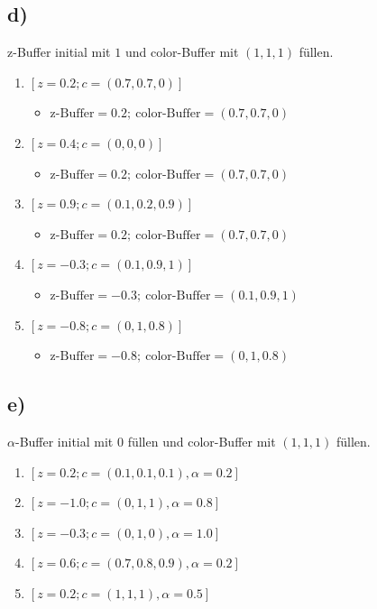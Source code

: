 \documentclass{article}
\begin{document}
\subsection*{d)}
z-Buffer initial mit $1$ und color-Buffer mit $(1,1,1)$ füllen. \\
\begin{enumerate}
    \item $[z = 0.2; c = (0.7, 0.7, 0)]$
          \begin{itemize}
              \item $\text{z-Buffer} = 0.2;\ \text{color-Buffer} = (0.7, 0.7, 0)$
          \end{itemize}
    \item $[z = 0.4; c = (0, 0, 0)]$
          \begin{itemize}
              \item $\text{z-Buffer} = 0.2;\ \text{color-Buffer} = (0.7, 0.7, 0)$
          \end{itemize}
    \item $[z = 0.9; c = (0.1, 0.2, 0.9)]$
          \begin{itemize}
              \item $\text{z-Buffer} = 0.2;\ \text{color-Buffer} = (0.7, 0.7, 0)$
          \end{itemize}
    \item $[z = -0.3; c = (0.1, 0.9, 1)]$
          \begin{itemize}
              \item $\text{z-Buffer} = -0.3;\ \text{color-Buffer} = (0.1, 0.9, 1)$
          \end{itemize}
    \item $[z = -0.8; c = (0, 1, 0.8)]$
          \begin{itemize}
              \item $\text{z-Buffer} = -0.8;\ \text{color-Buffer} = (0, 1, 0.8)$
          \end{itemize}
\end{enumerate}

\subsection*{e)}
$\alpha$-Buffer initial mit $0$ füllen und color-Buffer mit $(1,1,1)$ füllen. \\

\begin{enumerate}
    \item $[z = 0.2; c = (0.1, 0.1, 0.1), \alpha = 0.2]$
    \item $[z = -1.0; c = (0, 1, 1), \alpha = 0.8]$
    \item $[z = -0.3; c = (0, 1, 0), \alpha = 1.0]$
    \item $[z = 0.6; c = (0.7, 0.8, 0.9), \alpha = 0.2]$
    \item $[z = 0.2; c = (1, 1, 1), \alpha = 0.5]$
\end{enumerate}
\end{document}
